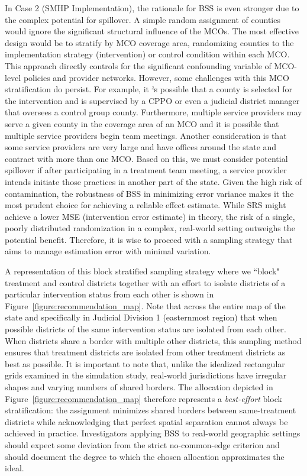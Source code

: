 \documentclass{article}[11pt]
\makeatletter
\providecommand{\DIFaddtex}[1]{{\protect\color{blue}\uwave{#1}}} %
\providecommand{\DIFdeltex}[1]{{\protect\color{red}\sout{#1}}} %
\providecommand{\DIFaddbegin}{} %
\providecommand{\DIFaddend}{} %
\providecommand{\DIFdelbegin}{} %
\providecommand{\DIFdelend}{} %
\providecommand{\DIFadd}[1]{\texorpdfstring{\DIFaddtex{#1}}{#1}} %
\providecommand{\DIFdel}[1]{\texorpdfstring{\DIFdeltex{#1}}{}} %
\providecommand{\DIFscaledelfig}{0.5}
\newlength{\DIFdelgraphicswidth} %
\newlength{\DIFdelgraphicsheight} %
\providecommand{\DIFaddincludegraphics}[2][]{{\color{blue}\fbox{\DIFOincludegraphics[#1]{#2}}}} %
\providecommand{\DIFdelincludegraphics}[2][]{%
\sbox{\DIFdelgraphicsbox}{\DIFOincludegraphics[#1]{#2}}%
\settoboxwidth{\DIFdelgraphicswidth}{\DIFdelgraphicsbox} %
\settoboxtotalheight{\DIFdelgraphicsheight}{\DIFdelgraphicsbox} %
\scalebox{\DIFscaledelfig}{%
\parbox[b]{\DIFdelgraphicswidth}{\usebox{\DIFdelgraphicsbox}\\[-\baselineskip] \rule{\DIFdelgraphicswidth}{0em}}\llap{\resizebox{\DIFdelgraphicswidth}{\DIFdelgraphicsheight}{%
\setlength{\unitlength}{\DIFdelgraphicswidth}%
\begin{picture}(1,1)%
\thicklines\linethickness{2pt} %
{\color[rgb]{1,0,0}\put(0,0){\framebox(1,1){}}}%
{\color[rgb]{1,0,0}\put(0,0){\line( 1,1){1}}}%
{\color[rgb]{1,0,0}\put(0,1){\line(1,-1){1}}}%
\end{picture}%
}\hspace*{3pt}}} %
} %
\DeclareRobustCommand{\DIFaddbegin}{\DIFOaddbegin \let\includegraphics\DIFaddincludegraphics} %
\DeclareRobustCommand{\DIFaddend}{\DIFOaddend \let\includegraphics\DIFOincludegraphics} %
\DeclareRobustCommand{\DIFdelbegin}{\DIFOdelbegin \let\includegraphics\DIFdelincludegraphics} %
\DeclareRobustCommand{\DIFdelend}{\DIFOaddend \let\includegraphics\DIFOincludegraphics} %
\let\sout@orig\sout %
\renewcommand{\sout}[1]{\ifmmode\text{\sout@orig{\ensuremath{#1}}}\else\sout@orig{#1}\fi} %
\makeatother
\begin{document}
In Case 2 (SMHP Implementation), the rationale for BSS is even stronger due to the complex potential for spillover. A simple random assignment of counties would ignore the significant structural influence of the MCOs. The most effective design would be to stratify by MCO coverage area, randomizing counties to the implementation strategy (intervention) or control condition within each MCO. This approach directly controls for the significant confounding variable of MCO-level policies and provider networks. However, some challenges with this MCO stratification do persist. For example, it \DIFdelbegin \DIFdel{'s }\DIFdelend \DIFaddbegin \DIFadd{is }\DIFaddend possible that a county is selected for the intervention and is supervised by a CPPO or even a judicial district manager that oversees a control group county. Furthermore, multiple service providers may serve a given county in the coverage area of an MCO and it is possible that multiple service providers begin team meetings. Another consideration is that some service providers are very large and have offices around the state and contract with more than one MCO. Based on this, we must consider potential spillover if after participating in a treatment team meeting, a service provider intends \DIFaddbegin \DIFadd{to }\DIFaddend initiate those practices in another part of the state. Given the high risk of contamination, the robustness of BSS in minimizing error variance makes it the most prudent choice for achieving a reliable effect estimate. While SRS might achieve a lower MSE (intervention error estimate) in theory, the risk of a single, poorly distributed randomization in a complex, real-world setting outweighs the potential benefit. Therefore, it is wise to proceed with a sampling strategy that aims to manage estimation error with minimal variation.

A representation of this block stratified sampling strategy where we ``block" treatment and control districts together with an effort to isolate districts of a particular intervention status from each other is shown in Figure~\ref{figure:recommendation_map}. Note that across the entire map of the state and specifically in Judicial Division 1 (easternmost region) that when possible districts of the same intervention status are isolated from each other. When districts share a border with multiple other districts, this sampling method ensures that treatment districts are isolated from other treatment districts as best as possible. It is important to note that, unlike the idealized rectangular grids examined in the simulation study, real-world jurisdictions have irregular shapes and varying numbers of shared borders. The allocation depicted in Figure~\ref{figure:recommendation_map} therefore represents a \textit{best-effort} block stratification: the assignment minimizes shared borders between same-treatment districts while acknowledging that perfect spatial separation cannot always be achieved in practice. Investigators applying BSS to real-world geographic settings should expect some deviation from the strict no-common-edge criterion and should document the degree to which the chosen allocation approximates the ideal.
\end{document}
